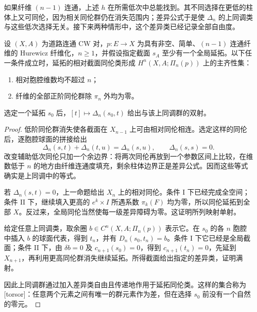 如果纤维 \((n-1)\) 连通，上述 \(h\) 在所需低次中总能找到。其不同选择在更低的柱体上又可同伦，因为相关同伦群仍在消失范围内；差异公式于是使 \(\Delta_n\) 的上同调类与这些低次选择无关。接下来两种情形中，这个差异类已经记录全部自由度。

\begin{theorem}\label{g2:thm:section-torsor}
	设 \((X,A)\) 为道路连通 CW 对，\(p:E\to X\) 为具有非空、简单、\((n-1)\) 连通纤维的 Hurewicz 纤维化，\(n\ge1\)，并假设指定截面 \(s_A\) 至少有一个全局延拓。以下任一条件成立时，延拓的相对截面同伦类形成 \(H^n(X,A;\Pi_n(p))\) 上的主齐性集：
	\begin{enumerate}
		\item 相对胞腔维数均不超过 \(n\)；
		\item 纤维的全部正阶同伦群除 \(\pi_n\) 外均为零。
	\end{enumerate}
	选定一个延拓 \(s_0\) 后，\([t]\mapsto\Delta_n(s_0,t)\) 给出与该上同调群的双射。
\end{theorem}
\begin{proof}
	低阶同伦群消失使各截面在 \(X_{n-1}\) 上可由相对同伦相连。选定这样的同伦后，逐胞腔球面的拼接给出
	\[
		\Delta_n(s,t)+\Delta_n(t,u)=\Delta_n(s,u),\qquad
		\Delta_n(s,s)=0.
	\]
	改变辅助低次同伦只加一个余边界：将两次同伦再放到一个参数区间上比较，在维数低于 \(n\) 的地方由纤维连通度填充，剩余柱体边界正是差异公式。因而这些等式确实是上同调中的等式。

	若 \(\Delta_n(s,t)=0\)，上一命题给出 \(X_n\) 上的相对同伦。条件 I 下已经完成全空间；条件 II 下，继续填入更高的 \(e^k\times I\) 所遇系数 \(\pi_k(F)\) 均为零，所以同伦延拓到全部 \(X\)。反过来，全局同伦当然使每一级差异障碍为零。这证明所列映射单射。

	给定任意上同调类，取余圈 \(b\in C^n(X,A;\Pi_n(p))\) 表示它。在 \(s_0\) 的各 \(n\) 胞腔中插入 \(b\) 的球面代表，得到 \(t_n\)，并有 \(D_n(s_0,t_n)=b\)。条件 I 下它已经是全局截面；条件 II 下，由 \(\delta b=0\) 及 \(c_{n+1}(s_0)=0\)，得到 \(c_{n+1}(t_n)=0\)，先延到 \(X_{n+1}\)，再利用更高同伦群消失继续延拓。所得截面给出指定的差异类，证明满射。

	因此上同调群通过加入差异类自由且传递地作用于延拓同伦类。这样的集合称为[torsor]：任意两个元素之间有唯一的群元素作为差，但在选择 \(s_0\) 前没有一个自然的零元。
\end{proof}

